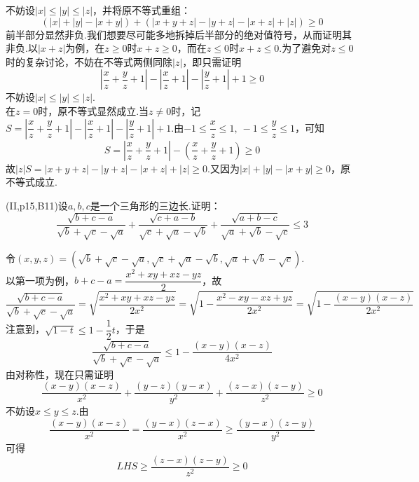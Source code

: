\documentclass[cn,hazy,black,10pt,normal]{elegantnote}
\newenvironment{guess}{
  \color{guess}}{\newline \color{black}}
\newcommand{\ssb}[1]{\left( #1 \right)}
\begin{document}
\begin{solution}
	\begin{guess}
		不妨设$|x| \leq |y| \leq |z|$，并将原不等式重组：$$(|x|+|y|-|x+y|)+(|x+y+z|-|y+z|-|x+z|+|z|) \geq 0$$
		前半部分显然非负.我们想要尽可能多地拆掉后半部分的绝对值符号，从而证明其非负.以$|x+z|$为例，在$z \geq 0$时$x+z \geq 0$，而在$z \leq 0$时$x+z \leq 0$.为了避免对$z \leq 0$时的复杂讨论，不妨在不等式两侧同除$|z|$，即只需证明$$\left|\frac{x}{z} + \frac{y}{z} + 1 \right| - \left|\frac{x}{z} + 1\right| - \left|\frac{y}{z} + 1\right| + 1 \geq 0$$
	\end{guess}
	不妨设$|x| \leq |y| \leq |z|$. \\
	在$z=0$时，原不等式显然成立.当$z \neq 0$时，记$S = \left|\dfrac{x}{z} + \dfrac{y}{z} + 1 \right| - \left|\dfrac{x}{z} + 1\right| - \left|\dfrac{y}{z} + 1\right| + 1$.由$-1 \leq \dfrac{x}{z} \leq 1,~-1 \leq \dfrac{y}{z} \leq 1$，可知$$S = \left|\dfrac{x}{z} + \dfrac{y}{z} + 1 \right| - \ssb{\dfrac{x}{z} + \dfrac{y}{z} + 1} \geq 0$$
	故$|z|S = |x+y+z|-|y+z|-|x+z|+|z| \geq 0$.又因为$|x| + |y| - |x+y| \geq 0$，原不等式成立.
\end{solution}

\begin{problem}
	(II,p15,B11)设$a,b,c$是一个三角形的三边长.证明：$$\frac{\sqrt{b+c-a}}{\sqrt{b}+\sqrt{c}-\sqrt{a}} + \frac{\sqrt{c+a-b}}{\sqrt{c}+\sqrt{a}-\sqrt{b}} + \frac{\sqrt{a+b-c}}{\sqrt{a}+\sqrt{b}-\sqrt{c}} \leq 3$$
\end{problem}
\begin{solution}
	令$(x,y,z)=\ssb{\sqrt{b}+\sqrt{c}-\sqrt{a},\sqrt{c}+\sqrt{a}-\sqrt{b},\sqrt{a}+\sqrt{b}-\sqrt{c}}$. \\
	以第一项为例，$b+c-a = \dfrac{x^2+xy+xz-yz}{2}$，故$$\frac{\sqrt{b+c-a}}{\sqrt{b}+\sqrt{c}-\sqrt{a}} = \sqrt{\frac{x^2+xy+xz-yz}{2x^2}} = \sqrt{1 - \frac{x^2 - xy - xz + yz}{2x^2}} = \sqrt{1 - \frac{(x-y)(x-z)}{2x^2}}$$
	注意到，$\sqrt{1-t} \leq 1 - \dfrac{1}{2}t$，于是$$\frac{\sqrt{b+c-a}}{\sqrt{b}+\sqrt{c}-\sqrt{a}} \leq 1 - \frac{(x-y)(x-z)}{4x^2}$$
	由对称性，现在只需证明$$\frac{(x-y)(x-z)}{x^2} + \frac{(y-z)(y-x)}{y^2} + \frac{(z-x)(z-y)}{z^2} \geq 0$$
	不妨设$x \leq y \leq z$.由$$\frac{(x-y)(x-z)}{x^2} = \frac{(y-x)(z-x)}{x^2} \geq \frac{(y-x)(z-y)}{y^2}$$
	可得$$LHS \geq \frac{(z-x)(z-y)}{z^2} \geq 0$$
\end{solution}
\end{document}
